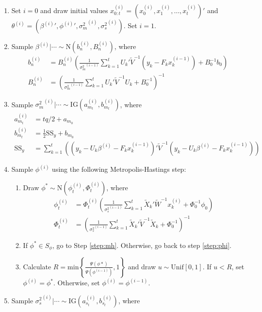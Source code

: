 \documentclass{article}
\begin{document}
\begin{enumerate}
\item Set $i = 0$ and draw initial values $x_{0:t}^{(i)} = \left(x_0^{(i)},x_1^{(i)},\ldots,x_t^{(i)}\right)'$ and $\theta^{(i)} = \left({\beta^{(i)}}', {\phi^{(i)}}', {\sigma^2_m}^{(i)}, {\sigma^2_s}^{(i)}\right)$. Set $i = 1$.
\item Sample $\beta^{(i)}|\cdots \sim \mbox{N}(b_n^{(i)}, B_n^{(i)})$, where
\begin{align*}
b_n^{(i)} &= B_n^{(i)}\left(\frac{1}{{\sigma^2_m}^{(i-1)}} \sum^t_{k=1} U_k'\tilde{V}^{-1}(y_k - F_kx_k^{(i-1)}) + B_0^{-1}b_0\right) \\
B_n^{(i)} &= \left(\frac{1}{{\sigma^2_m}^{(i-1)}} \sum^t_{k=1} U_k'\tilde{V}^{-1}U_k + B_0^{-1}\right)^{-1}
\end{align*}
\item Sample ${\sigma^2_m}^{(i)}|\cdots \sim \mbox{IG}(a_{m_t}^{(i)}, b_{m_t}^{(i)})$, where
\begin{align*}
a_{m_t}^{(i)} &= tq/2 + a_{m_0} \\
b_{m_t}^{(i)} &= \frac{1}{2}\mbox{SS}_y + b_{m_0} \\
\mbox{SS}_y &= \sum^t_{k=1} \left((y_k - U_k\beta^{(i)} - F_kx_k^{(i-1)})'\tilde{V}^{-1}(y_k - U_k\beta^{(i)} - F_kx_k^{(i-1)})\right)
\end{align*}
\item Sample $\phi^{(i)}$ using the following Metropolis-Hastings step:
\begin{enumerate}
\item Draw $\phi^* \sim \mbox{N}(\phi_t^{(i)},\Phi_t^{(i)})$, where
\begin{align*}
\phi_t^{(i)} &= \Phi_t^{(i)}\left(\frac{1}{{\sigma^2_s}^{(i-1)}} \sum^t_{k=1} \tilde{X}_k'\tilde{W}^{-1}x_k^{(i)} + \Phi_0^{-1}\phi_0\right) \\
\Phi_t^{(i)} &= \left(\frac{1}{{\sigma^2_s}^{(i-1)}} \sum^t_{k=1} \tilde{X}_k'\tilde{V}^{-1}\tilde{X}_k + \Phi_0^{-1}\right)^{-1}
\end{align*} \label{step:phi}
\item If $\phi^* \in S_{\phi}$, go to Step \ref{step:mh}. Otherwise, go back to step \ref{step:phi}.
\item Calculate $R = \mbox{min}\left\{\frac{\Psi(\phi*)}{\Psi(\phi^{(i-1)})}, 1\right\}$ and draw $u \sim \mbox{Unif}[0,1]$. If $u < R$, set $\phi^{(i)} = \phi^*$. Otherwise, set $\phi^{(i)} = \phi^{(i-1)}$. \label{step:mh}
\end{enumerate}
\item Sample ${\sigma^2_s}^{(i)}|\cdots \sim \mbox{IG}(a_{s_t}^{(i)}, b_{s_t}^{(i)})$, where

\end{enumerate}
\end{document}
